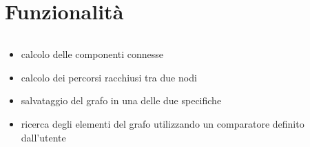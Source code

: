 \documentclass{beamer}
\begin{document}

\section{Funzionalità}
\begin{frame}{\secname}
	\begin{columns}
		\begin{column}{\textwidth}
			\begin{itemize}
				\item calcolo delle componenti connesse
				\item calcolo dei percorsi racchiusi tra due nodi
				\item salvataggio del grafo in una delle due specifiche
				\item ricerca degli elementi del grafo utilizzando un comparatore
					definito dall'utente
			\end{itemize}
		\end{column}
	\end{columns}
\end{frame}

\end{document}
